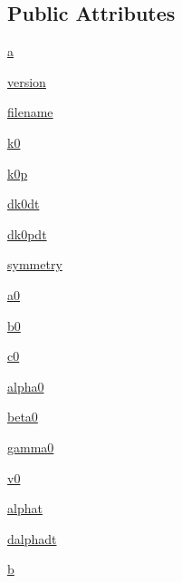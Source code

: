\subsection*{Public Attributes}
\begin{DoxyCompactItemize}
\item 
\hyperlink{class_j_c_p_d_s_1_1_j_c_p_d_s_a809397a9da7c35ae0a3ad9fca1cabc73}{a}
\item 
\hyperlink{class_j_c_p_d_s_1_1_j_c_p_d_s_af32006e867dad5c863a396af1590c34f}{version}
\item 
\hyperlink{class_j_c_p_d_s_1_1_j_c_p_d_s_ac7bb249be2c2ff3d89ca89c5cf9fba26}{filename}
\item 
\hyperlink{class_j_c_p_d_s_1_1_j_c_p_d_s_a5107a25f1f6940a39ce5f7391ff87b21}{k0}
\item 
\hyperlink{class_j_c_p_d_s_1_1_j_c_p_d_s_a20801fc810dd360855e81c7c8c486d78}{k0p}
\item 
\hyperlink{class_j_c_p_d_s_1_1_j_c_p_d_s_a1423572b84a46fa0739fba9892d55fdf}{dk0dt}
\item 
\hyperlink{class_j_c_p_d_s_1_1_j_c_p_d_s_a281da0716f471977727858228cbddaa4}{dk0pdt}
\item 
\hyperlink{class_j_c_p_d_s_1_1_j_c_p_d_s_af8dfc3bb57b6bd48b9eeed7d4eb19685}{symmetry}
\item 
\hyperlink{class_j_c_p_d_s_1_1_j_c_p_d_s_acfb0a8fef740164e10c7b87d92aa82d6}{a0}
\item 
\hyperlink{class_j_c_p_d_s_1_1_j_c_p_d_s_a7760bcfe96b190ba393928e70ed996cb}{b0}
\item 
\hyperlink{class_j_c_p_d_s_1_1_j_c_p_d_s_a81fa032e6345e4ec9baa962f65507ef6}{c0}
\item 
\hyperlink{class_j_c_p_d_s_1_1_j_c_p_d_s_a8b17a58f7870b085673c881db21b8335}{alpha0}
\item 
\hyperlink{class_j_c_p_d_s_1_1_j_c_p_d_s_a45086584379c67ece36240b890741c61}{beta0}
\item 
\hyperlink{class_j_c_p_d_s_1_1_j_c_p_d_s_aa9826897893cdc97c509c90187c61d8c}{gamma0}
\item 
\hyperlink{class_j_c_p_d_s_1_1_j_c_p_d_s_aef3a4e5b9b3659dc953d276e53a12743}{v0}
\item 
\hyperlink{class_j_c_p_d_s_1_1_j_c_p_d_s_ae09f3ff37073046c2ceb1c1aa3a6864c}{alphat}
\item 
\hyperlink{class_j_c_p_d_s_1_1_j_c_p_d_s_a1254951d6b1ef48336305b1ad1175394}{dalphadt}
\item 
\hyperlink{class_j_c_p_d_s_1_1_j_c_p_d_s_a676bd92e3b0d5b98eccc73b3caf63adf}{b}
\item 

\end{DoxyCompactItemize}
